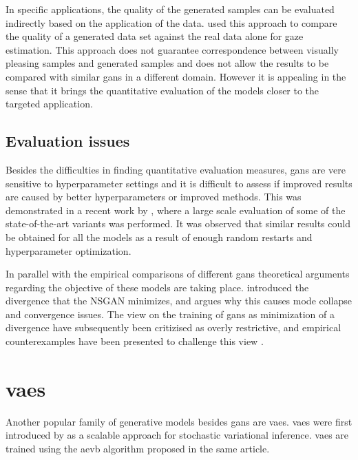In specific applications, the quality of the generated samples can be evaluated indirectly based on the application of the data. \textcite{shrivastava2016learning} used this approach to compare the quality of a generated data set against the real data alone for gaze estimation. This approach does not guarantee correspondence between visually pleasing samples and generated samples and does not allow the results to be compared with similar \acrshort{gans} in a different domain. However it is appealing in the sense that it brings the quantitative evaluation of the models closer to the targeted application. 

\subsection{Evaluation issues}
Besides the difficulties in finding quantitative evaluation measures, \acrshort{gans} are vere sensitive to hyperparameter settings and it is difficult to assess if improved results are caused by better hyperparameters or improved methods. This was demonstrated in a recent work by \textcite{lucic2017gans}, where a large scale evaluation of some of the state-of-the-art variants was performed. It was observed that similar results could be obtained for all the models as a result of enough random restarts and hyperparameter optimization.

In parallel with the empirical comparisons of different \acrshort{gans} theoretical arguments regarding the objective of these models are taking place. \textcite{arjovsky2017towards} introduced the divergence that the NSGAN minimizes, and argues why this causes mode collapse and convergence issues. The view on the training of \acrshort{gans} as minimization of a divergence have subsequently been critizised as overly restrictive, and empirical counterexamples have been presented to challenge this view \textcite{fedus2017many}.


\section{\acrlong{vaes}}
Another popular family of generative models besides \acrshort{gans} are \acrfull{vaes}. \acrlong{vaes} were first introduced by \textcite{kingma2013auto} as a scalable approach for stochastic variational inference. \acrshort{vaes} are trained using the \acrfull{aevb} algorithm proposed in the same article. 

